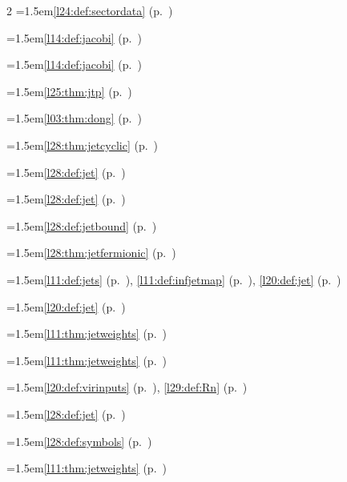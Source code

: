 \begin{multicols}{2}
\hangindent=1.5em\quad \ref{l24:def:sectordata} (p.~\pageref{l24:def:sectordata})\par
\hangindent=1.5em\quad \ref{l14:def:jacobi} (p.~\pageref{l14:def:jacobi})\par
\hangindent=1.5em\quad \ref{l14:def:jacobi} (p.~\pageref{l14:def:jacobi})\par
\hangindent=1.5em\quad \ref{l25:thm:jtp} (p.~\pageref{l25:thm:jtp})\par
\hangindent=1.5em\quad \ref{l03:thm:dong} (p.~\pageref{l03:thm:dong})\par
\hangindent=1.5em\quad \ref{l28:thm:jetcyclic} (p.~\pageref{l28:thm:jetcyclic})\par
\hangindent=1.5em\quad \ref{l28:def:jet} (p.~\pageref{l28:def:jet})\par
\hangindent=1.5em\quad \ref{l28:def:jet} (p.~\pageref{l28:def:jet})\par
\hangindent=1.5em\quad \ref{l28:def:jetbound} (p.~\pageref{l28:def:jetbound})\par
\hangindent=1.5em\quad \ref{l28:thm:jetfermionic} (p.~\pageref{l28:thm:jetfermionic})\par
\hangindent=1.5em\quad \ref{l11:def:jets} (p.~\pageref{l11:def:jets}), \ref{l11:def:infjetmap} (p.~\pageref{l11:def:infjetmap}), \ref{l20:def:jet} (p.~\pageref{l20:def:jet})\par
\hangindent=1.5em\quad \ref{l20:def:jet} (p.~\pageref{l20:def:jet})\par
\hangindent=1.5em\quad \ref{l11:thm:jetweights} (p.~\pageref{l11:thm:jetweights})\par
\hangindent=1.5em\quad \ref{l11:thm:jetweights} (p.~\pageref{l11:thm:jetweights})\par
\hangindent=1.5em\quad \ref{l20:def:virinputs} (p.~\pageref{l20:def:virinputs}), \ref{l29:def:Rn} (p.~\pageref{l29:def:Rn})\par
\hangindent=1.5em\quad \ref{l28:def:jet} (p.~\pageref{l28:def:jet})\par
\hangindent=1.5em\quad \ref{l28:def:symbols} (p.~\pageref{l28:def:symbols})\par
\hangindent=1.5em\quad \ref{l11:thm:jetweights} (p.~\pageref{l11:thm:jetweights})\par

\end{multicols}
